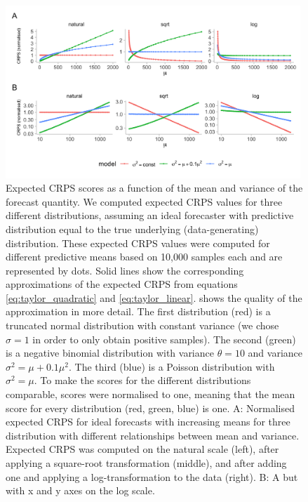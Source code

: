 \documentclass[10pt,letterpaper]{article}
\begin{document}
\begin{figure}[h!]
    \centering
    \includegraphics[width=0.99\textwidth]{../output/figures/SIM-mean-state-size.png}
    \caption{Expected CRPS scores as a function of the mean and variance of the forecast quantity. We computed expected CRPS values  for three different distributions, assuming an ideal forecaster with predictive distribution equal to the true underlying (data-generating) distribution. 
    These expected CRPS values were computed for different predictive means based on 10,000 samples each and are represented by dots. Solid lines show the corresponding approximations of the expected CRPS from equations \eqref{eq:taylor_quadratic} and \eqref{eq:taylor_linear}.  shows the quality of the approximation in more detail. 
    The first distribution (red) is a truncated normal distribution with constant variance (we chose $\sigma = 1$ in order to only obtain positive samples). The second (green) is a negative binomial distribution with variance $\theta = 10$ and variance $\sigma^2 = \mu + 0.1\mu^2$. The third (blue) is a
    Poisson distribution with $\sigma^2 = \mu$. To make the scores for the different distributions comparable, scores were normalised to one, meaning that the mean score for every distribution (red, green, blue) is one. 
    A: Normalised expected CRPS for ideal forecasts with increasing means for three distribution with different relationships between mean and variance. Expected CRPS was computed on the natural scale (left), after applying a square-root transformation (middle), and after adding one and applying a log-transformation to the data (right). B: A but with x and y axes on the log scale.}
    \label{fig:SIM-wis-state-size-mean}
\end{figure}
\end{document}
